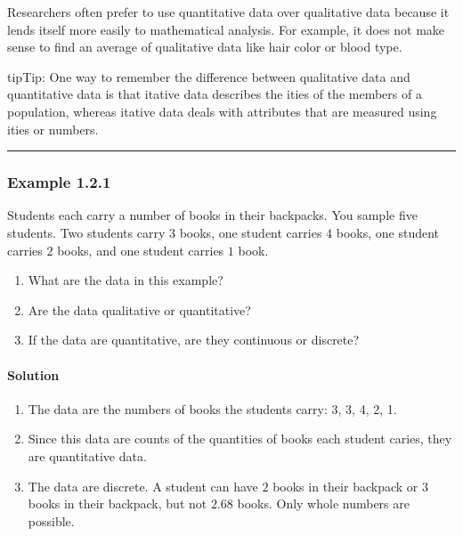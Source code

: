 \documentclass[letterpaper,10pt,english]{jupyterBook}
\begin{document}
\sphinxAtStartPar
Researchers often prefer to use quantitative data over qualitative data because it lends itself more easily to mathematical analysis. For example, it does not make sense to find an average of qualitative data like hair color or blood type.

\begin{sphinxadmonition}{tip}{Tip:}
\sphinxAtStartPar
One way to remember the difference between qualitative data and quantitative data is that itative data describes the ities of the members of a population, whereas itative data deals with attributes that are measured using ities or numbers.
\end{sphinxadmonition}


\bigskip\hrule\bigskip



\subsubsection{Example 1.2.1}
\label{\detokenize{Ch1 Sampling and Data/1.2 Scales of Measurement:example-1-2-1}}
\sphinxAtStartPar
Students each carry a number of books in their backpacks. You sample five students. Two students carry \(3\) books, one student carries \(4\) books, one student carries \(2\) books, and one student carries \(1\) book.
\begin{enumerate}
%
\item {} 
\sphinxAtStartPar
What are the data in this example?

\item {} 
\sphinxAtStartPar
Are the data qualitative or quantitative?

\item {} 
\sphinxAtStartPar
If the data are quantitative, are they continuous or discrete?

\end{enumerate}


\paragraph{Solution}
\label{\detokenize{Ch1 Sampling and Data/1.2 Scales of Measurement:solution}}\begin{enumerate}
%
\item {} 
\sphinxAtStartPar
The data are the numbers of books the students carry: 3, 3, 4, 2, 1.

\item {} 
\sphinxAtStartPar
Since this data are counts of the quantities of books each student caries, they are quantitative data.

\item {} 
\sphinxAtStartPar
The data are discrete. A student can have \(2\) books in their backpack or \(3\) books in their backpack, but not \(2.68\) books. Only whole numbers are possible.

\end{enumerate}
\end{document}

